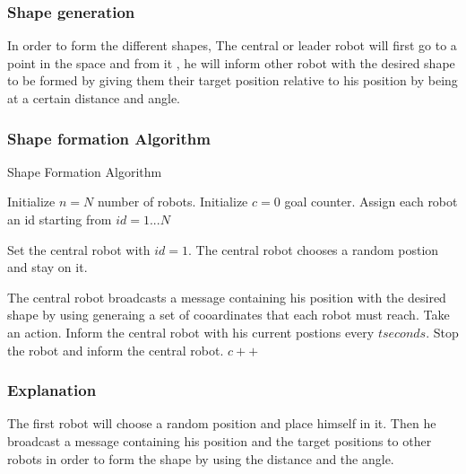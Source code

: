 \documentclass[12pt]{extarticle}
\begin{document}
\pagebreak
\subsubsection{Shape generation}
In order to form the different shapes, The central or leader robot will first go to a point in the space and from it , he will inform  other robot with the desired shape to be formed by giving them their target position relative to his position by being at a certain distance and angle.



\subsubsection{Shape formation Algorithm}


\begin{algorithm}[H]
\caption{Shape Formation Algorithm}
\label{alg:ddpg}
\begin{algorithmic}[1]

\State Initialize $n=N$ number of robots.
\State Initialize $c=0$ goal counter.
\State Assign each robot an id starting from $id=1...N$

\State Set the central robot with $id=1$.
\State The central robot  chooses a random postion and stay on it.

\State The central robot broadcasts a message containing his position with the desired shape by using generaing a set of cooardinates that each robot must reach.
\State Take an action.
\State Inform the central robot with his current postions every $t seconds$.
    \State Stop the robot and inform the central robot.
    \State $c++$ 

\EndIf 

\EndFor

\EndWhile

\end{algorithmic}
\end{algorithm}

\subsubsection{Explanation}

The first robot will choose a random position and place himself in it. Then he broadcast a message containing his position and the target positions to other robots in order to form the shape by using the distance and the angle.
\end{document}
